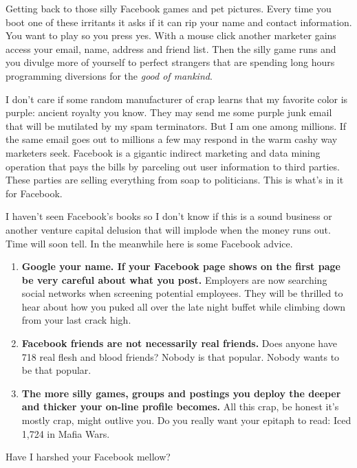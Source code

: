 Getting back to those silly Facebook games and pet pictures. Every time
you boot one of these irritants it asks if it can rip your name and
contact information. You want to play so you press yes. With a mouse
click another marketer gains access your email, name, address and friend
list. Then the silly game runs and you divulge more of yourself to
perfect strangers that are spending long hours programming diversions
for the \emph{good of mankind}.

I don't care if some random manufacturer of crap learns that my favorite
color is purple: ancient royalty you know. They may send me some purple
junk email that will be mutilated by my spam terminators. But I am one
among millions. If the same email goes out to millions a few may respond
in the warm cashy way marketers seek. Facebook is a gigantic indirect
marketing and data mining operation that pays the bills by parceling out
user information to third parties. These parties are selling everything
from soap to politicians. This is what's in it for Facebook.

I haven't seen Facebook's books so I don't know if this is a sound
business or another venture capital delusion that will implode when the
money runs out. Time will soon tell. In the meanwhile here is some
Facebook advice.

\begin{enumerate}
\item
  \textbf{Google your name. If your Facebook page shows on the first
  page be very careful about what you post.} Employers are now searching
  social networks when screening potential employees. They will be
  thrilled to hear about how you puked all over the late night buffet
  while climbing down from your last crack high.
\item
  \textbf{Facebook friends are not necessarily real friends.} Does
  anyone have 718 real flesh and blood friends? Nobody is that popular.
  Nobody wants to be that popular.
\item
  \textbf{The more silly games, groups and postings you deploy the
  deeper and thicker your on-line profile becomes.} All this crap, be
  honest it's mostly crap, might outlive you. Do you really want your
  epitaph to read: Iced 1,724 in Mafia Wars.
\end{enumerate}
Have I harshed your Facebook mellow?



%